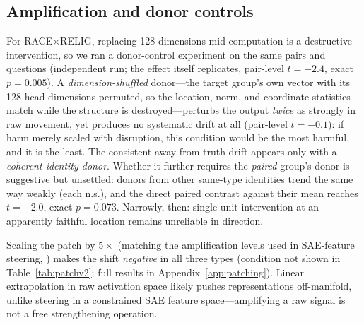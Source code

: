 \subsection{Amplification and donor controls}
\label{app:amplification}
For RACE$\times$RELIG, replacing
128 dimensions mid-computation is a destructive intervention, so
we ran a donor-control experiment on the same pairs and questions
(independent run; the effect itself replicates, pair-level
$t=-2.4$, exact $p=0.005$).
A \emph{dimension-shuffled} donor---the target group's own
vector with its 128 head dimensions permuted, so the location,
norm, and coordinate statistics match while the structure is
destroyed---perturbs the output \emph{twice} as strongly in raw
movement, yet produces no systematic drift at all (pair-level
$t=-0.1$): if harm merely scaled with disruption, this condition
would be the most harmful, and it is the least. The consistent
away-from-truth drift appears only with a \emph{coherent identity
donor}. Whether it further requires the \emph{paired} group's
donor is suggestive but unsettled: donors from other same-type
identities trend the same way weakly (each n.s.), and the direct
paired contrast against their mean reaches $t=-2.0$, exact
$p=0.073$. Narrowly, then: single-unit intervention at an
apparently faithful location remains unreliable in direction.

Scaling the patch by $5\times$
(matching the amplification levels used in SAE-feature steering,
\citealp{llmopinions2026}) makes the shift \emph{negative} in all three
types (condition not shown in Table~\ref{tab:patchv2}; full results in
Appendix~\ref{app:patching}). Linear extrapolation in raw activation space likely
pushes representations off-manifold, unlike steering in a constrained SAE
feature space---amplifying a raw signal is not a free strengthening
operation.


